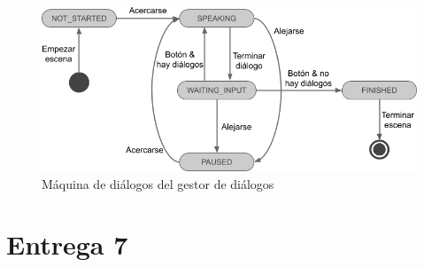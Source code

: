 \begin{figure}[!h]
\begin{center}
\includegraphics[width=1\textwidth]{imagenes/7/maquina-estados-dialogos.png}
\caption{Máquina de diálogos del gestor de diálogos}
\label{fig:dialogs-state-machine}
\end{center}
\end{figure}

\section{Entrega 7}

